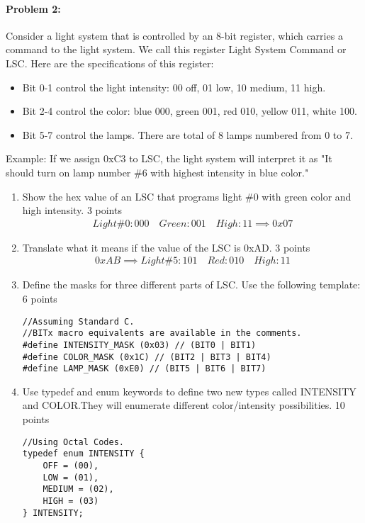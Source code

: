 \documentclass[12pt,letterpaper,titlepage]{article}
\begin{document}
\begin{raggedright}
\clearpage

\paragraph{Problem 2: }
Consider a light system that is controlled by an 8-bit register, which carries a command to the light system. We call this register Light System Command or LSC. Here are the specifications of this register:

\begin{itemize}
\item Bit 0-1 control the light intensity: 00 off, 01 low, 10 medium, 11 high.
\item Bit 2-4 control the color: blue 000, green 001, red 010, yellow 011, white 100.
\item Bit 5-7 control the lamps. There are total of 8 lamps numbered from 0 to 7.
\end{itemize}

Example: If we assign 0xC3 to LSC, the light system will interpret it as "It should turn on lamp number \#6 with highest intensity in blue color."

\begin{enumerate}[label=\Alph*.]
\item Show the hex value of an LSC that programs light \#0 with green color and high intensity. 3 points 
\begin{align*}
Light\#0:000\quad Green:001\quad High:11 \implies 0x07
\end{align*}

\item Translate what it means if the value of the LSC is 0xAD. 3 points 
\begin{align*}
0xAB \implies Light\#5:101\quad Red:010\quad High:11
\end{align*}
\item Define the masks for three different parts of LSC. Use the following template: 6 points 
\begin{lstlisting}
//Assuming Standard C. 
//BITx macro equivalents are available in the comments.
#define INTENSITY_MASK (0x03) // (BIT0 | BIT1)
#define COLOR_MASK (0x1C) // (BIT2 | BIT3 | BIT4)
#define LAMP_MASK (0xE0) // (BIT5 | BIT6 | BIT7)
\end{lstlisting}

\pagebreak

\item Use typedef and enum keywords to define two new types called INTENSITY and COLOR.They will enumerate different color/intensity possibilities. 10 points
\begin{lstlisting}
//Using Octal Codes.
typedef enum INTENSITY {
	OFF = (00),
	LOW = (01),
	MEDIUM = (02),
	HIGH = (03)
} INTENSITY;


\end{lstlisting}
\end{enumerate}
\end{raggedright}
\end{document}
